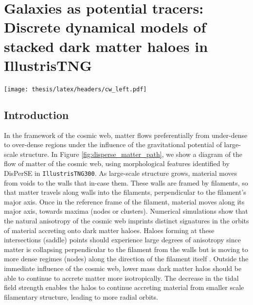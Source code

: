 \chapter[Discrete dynamical models of stacked dark matter haloes]{Galaxies as potential tracers: \\ Discrete dynamical models of stacked dark matter haloes in IllustrisTNG}
\label{ch:dyn_mod}
\vspace{-5.25in}
\texttt{[image: thesis/latex/headers/cw\_left.pdf]}
\vspace{3in}


\section{Introduction}
In the framework of the cosmic web, matter flows preferentially from under-dense to over-dense regions under the influence of the gravitational potential of large-scale structure. In Figure \ref{fig:disperse_matter_path}, we show a diagram of the flow of matter of the cosmic web, using morphological features identified by DisPerSE in \texttt{IllustrisTNG300}. As large-scale structure grows, material moves from voids to the walls that in-case them. These walls are framed by filaments, so that matter travels along walls into the filaments, perpendicular to the filament's major axis. Once in the reference frame of the filament, material moves along its major axis, towards maxima (nodes or clusters). Numerical simulations show that the natural anisotropy of the cosmic web imprints distinct signatures in the orbits of material accreting onto dark matter haloes. Haloes forming at these intersections (saddle) points should experience large degrees of anisotropy since matter is collapsing perpendicular to the filament from the walls but is moving to more dense regimes (nodes) along the direction of the filament itself \citep[e.g.][for galaxy properties in saddle environments]{kraljic2019saddle}. Outside the immediate influence of the cosmic web, lower mass dark matter halos should be able to continue to accrete matter more isotropically. The decrease in the tidal field strength enables the halos to continue accreting material from smaller scale filamentary structure, leading to more radial orbits.

